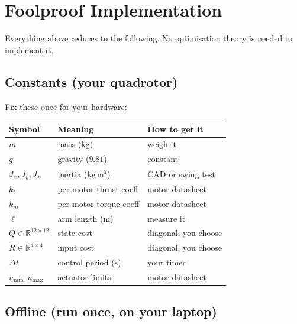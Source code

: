 \documentclass[11pt]{article}
\newcommand{\R}{\mathbb{R}}
\begin{document}
\section{Foolproof Implementation}\label{sec:foolproof}

Everything above reduces to the following.
No optimisation theory is needed to implement it.

\subsection{Constants (your quadrotor)}

Fix these once for your hardware:
\begin{center}
\renewcommand{\arraystretch}{1.2}
\begin{tabular}{@{}l l l@{}}
\toprule
\textbf{Symbol} & \textbf{Meaning} & \textbf{How to get it} \\
\midrule
$m$ & mass (kg) & weigh it \\
$g$ & gravity ($9.81$) & constant \\
$J_x, J_y, J_z$ & inertia (kg\,m$^2$)
  & CAD or swing test \\
$k_t$ & per-motor thrust coeff & motor datasheet \\
$k_m$ & per-motor torque coeff & motor datasheet \\
$\ell$ & arm length (m) & measure it \\
$Q \in \R^{12 \times 12}$ & state cost
  & diagonal, you choose \\
$R \in \R^{4 \times 4}$ & input cost
  & diagonal, you choose \\
$\Delta t$ & control period (s)
  & your timer \\
$u_{\min}, u_{\max}$ & actuator limits
  & motor datasheet \\
\bottomrule
\end{tabular}
\end{center}

\subsection{Offline (run once, on your laptop)}
\end{document}
